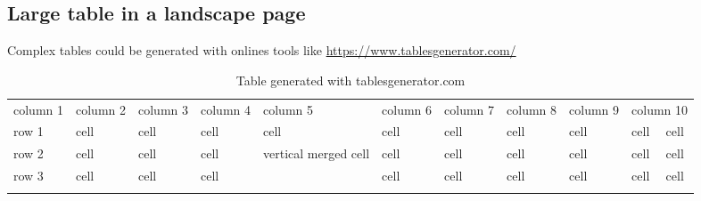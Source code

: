 \documentclass[Theme1]{{template_material/eurostat}}
\begin{document}
\begin{landscape}
\subsection{Large table in a landscape page}
Complex tables could be generated with onlines tools like \url{https://www.tablesgenerator.com/}

\begin{table}[h]
 \caption{Table generated with tablesgenerator.com}
 \label{table:C}
 
    \begin{tabular}{l|l|l|l|l|l|l|l|l|l|l}
    \hlinesep
     \rowcolor{TH20p} column 1 & column 2 & column 3 & column 4 & column 5                              & column 6 & column 7 & column 8 & column 9 & \multicolumn{2}{l}{column 10} \\ \hlinesep
   
    row 1    & cell     & cell     & cell     & cell                                  & cell     & cell     & cell     & cell     & cell           & cell          \\ \hline
    row 2    & cell     & cell     & cell     & \multirow{2}{*}{vertical merged cell} & cell     & cell     & cell     & cell     & cell           & cell          \\ \cline{1-4} \cline{6-11} 
    row 3    & cell     & cell     & cell     &                                       & cell     & cell     & cell     & cell     & cell           & cell          \\ \hlinesep
    \end{tabular}
\end{table}




\begin{table}[h]


\end{table}
\end{landscape}
\end{document}
